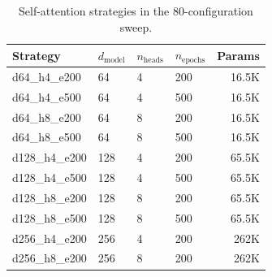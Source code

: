 \documentclass[12pt,a4paper]{article}
\begin{document}
\newpage
\begin{table}[H]
\centering
\caption{Self-attention strategies in the 80-configuration sweep.}
\label{tab:strategies}
\begin{tabular}{llllr}
\toprule
Strategy & $d_{\text{model}}$ & $n_{\text{heads}}$ & $n_{\text{epochs}}$ & Params \\
\midrule
d64\_h4\_e200 & 64 & 4 & 200 & 16.5K \\
d64\_h4\_e500 & 64 & 4 & 500 & 16.5K \\
d64\_h8\_e200 & 64 & 8 & 200 & 16.5K \\
d64\_h8\_e500 & 64 & 8 & 500 & 16.5K \\
d128\_h4\_e200 & 128 & 4 & 200 & 65.5K \\
d128\_h4\_e500 & 128 & 4 & 500 & 65.5K \\
d128\_h8\_e200 & 128 & 8 & 200 & 65.5K \\
d128\_h8\_e500 & 128 & 8 & 500 & 65.5K \\
d256\_h4\_e200 & 256 & 4 & 200 & 262K \\
d256\_h8\_e200 & 256 & 8 & 200 & 262K \\
\bottomrule
\end{tabular}
\end{table}
\newpage
\end{document}
